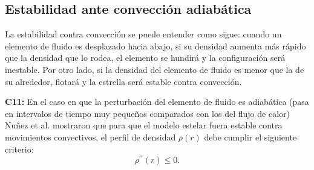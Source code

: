 \subsection*{Estabilidad ante convección adiabática}

La estabilidad contra convección se puede entender como sigue: cuando un elemento de fluido es desplazado hacia abajo, si su densidad aumenta más rápido que la densidad que lo rodea, el elemento se hundirá y la configuraci\'on será inestable. Por otro lado, si la densidad del elemento de fluido es menor que la de su alrededor, flotará y la estrella será estable contra convección.

\textbf{C11:} En el caso en que la perturbación del elemento de fluido es adiabática (pasa en intervalos de tiempo muy pequeños comparados con los del flujo de calor) Nuñez et al. \cite{Hernandez2018} mostraron que para que el modelo estelar fuera estable contra movimientos convectivos, el perfil de densidad $\rho(r)$ debe cumplir el siguiente criterio: 
\begin{equation}
    \rho ^ { \prime \prime } ( r ) \leq 0.
\end{equation}